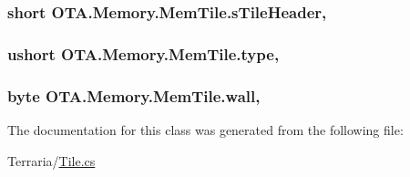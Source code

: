 \subsubsection[{s\+Tile\+Header}]{\setlength{\rightskip}{0pt plus 5cm}short O\+T\+A.\+Memory.\+Mem\+Tile.\+s\+Tile\+Header\hspace{0.3cm}{\ttfamily [get]}, {\ttfamily [set]}}\label{class_o_t_a_1_1_memory_1_1_mem_tile_adb45a14b2bfd64f87ff413f84219ef35}
\hypertarget{class_o_t_a_1_1_memory_1_1_mem_tile_a1ba0b20369ea76b26ee3402c879e4809}{}
\subsubsection[{type}]{\setlength{\rightskip}{0pt plus 5cm}ushort O\+T\+A.\+Memory.\+Mem\+Tile.\+type\hspace{0.3cm}{\ttfamily [get]}, {\ttfamily [set]}}\label{class_o_t_a_1_1_memory_1_1_mem_tile_a1ba0b20369ea76b26ee3402c879e4809}
\hypertarget{class_o_t_a_1_1_memory_1_1_mem_tile_a325c20962bd1199bd63cecd5c178fc40}{}
\subsubsection[{wall}]{\setlength{\rightskip}{0pt plus 5cm}byte O\+T\+A.\+Memory.\+Mem\+Tile.\+wall\hspace{0.3cm}{\ttfamily [get]}, {\ttfamily [set]}}\label{class_o_t_a_1_1_memory_1_1_mem_tile_a325c20962bd1199bd63cecd5c178fc40}


The documentation for this class was generated from the following file\+:\begin{DoxyCompactItemize}
\item 
Terraria/\hyperlink{_tile_8cs}{Tile.\+cs}\end{DoxyCompactItemize}
